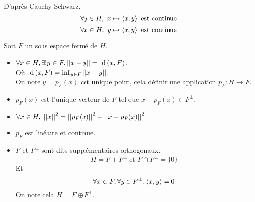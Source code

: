\begin{remarque}
	D'après Cauchy-Schwarz,
	$$ \forall y \in H, \  x \mapsto \left\langle x, y \right\rangle \text{ est continue} $$
	$$ \forall x \in H, \  y \mapsto \left\langle x, y \right\rangle \text{ est continue} $$
\end{remarque}

\begin{theorem}
	Soit $F$ un sous espace fermé de $H$.

	\begin{itemize}
		\item $\forall x \in H, \exists ! y \in F, \left|\left|x-y\right|\right| = \text{ d}\left(x, F\right)$.\\
		      Où $\text{ d}\left(x, F\right) = \inf_{y \in F} \left|\left|x-y\right|\right|$.\\
		      On note $y = p_F(x)$ cet unique point, cela définit une application $p_F : H \to F$.
		\item $p_F(x)$ est l'unique vecteur de $F$ tel que $x - p_F(x) \in F^\perp$.
		\item $\forall x \in H,\ \left|\left|x\right|\right|^2 = \left|\left|p_F(x)\right|\right|^2 + \left|\left|x - p_F(x)\right|\right|^2$.
		\item $p_F$ est linéaire et continue.
		\item $F$ et $F^\perp$ sont dits supplémentaires orthogonaux.\\
		      $$ H = F + F^\perp \text{ et } F \cap F^\perp = \{0\} $$
		      Et $$\forall x \in F , \forall y \in F^\perp, \left\langle x, y \right\rangle = 0$$
		      On note cela $H = F \oplus F^\perp$.
	\end{itemize}
\end{theorem}


